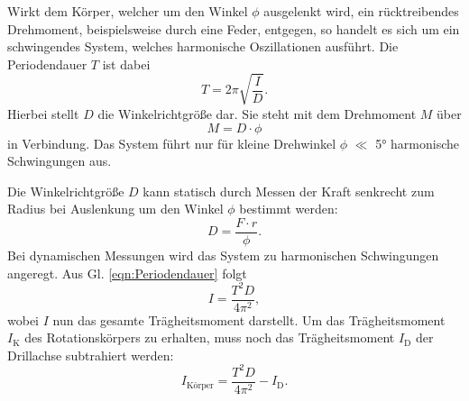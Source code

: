 Wirkt dem Körper, welcher um den Winkel $\phi$ ausgelenkt wird,
ein rücktreibendes Drehmoment, beispielsweise durch eine Feder,
entgegen, so handelt es sich um ein schwingendes System, welches
harmonische Oszillationen ausführt. Die Periodendauer $T$ ist dabei
\begin{equation}
T = 2\pi \sqrt{\frac{I}{D}}.
\label{eqn:Periodendauer}
\end{equation}
Hierbei stellt $D$ die Winkelrichtgröße dar. Sie steht mit
dem Drehmoment $M$ über
\begin{equation}
M = D \cdot \phi
\end{equation}
in Verbindung. Das System führt nur für kleine
Drehwinkel $\phi$ \(\ll\) 5° harmonische Schwingungen aus.
\par
Die Winkelrichtgröße $D$ kann statisch durch Messen der Kraft
senkrecht zum Radius bei Auslenkung um den Winkel $\phi$
bestimmt werden:
\begin{equation}
\label{eqn:winkelrichtgroeße}
D = \frac{F \cdot r}{\phi}.
\end{equation}
Bei dynamischen Messungen wird das System zu harmonischen
Schwingungen angeregt. Aus Gl. \eqref{eqn:Periodendauer} folgt
\begin{equation*}
I = \frac{T^2D}{4\pi^2},
\end{equation*}
wobei $I$ nun das gesamte Trägheitsmoment darstellt. Um das
Trägheitsmoment $I_{\text{K}}$ des Rotationskörpers zu erhalten,
muss noch das Trägheitsmoment $I_{\text{D}}$ der Drillachse
subtrahiert werden:
\begin{equation}
  \label{eqn:taegheitsmoment}
I_{\text{Körper}} = \frac{T^2D}{4\pi^2} - I_{\text{D}}.
\end{equation}
